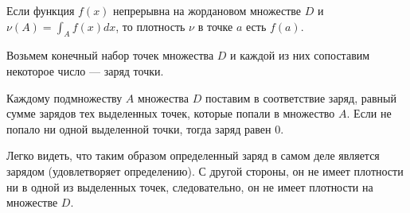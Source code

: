 \begin{theorem*}
    Если функция $f(x)$ непрерывна на жордановом множестве $D$ и $\nu(A) = \int_A f(x) dx$, то плотность $\nu$ в точке $a$ есть $f(a)$.
\end{theorem*}

\begin{example}
    Возьмем конечный набор точек множества $D$ и каждой из них сопоставим некоторое число --- заряд точки.

    Каждому подмножеству $A$ множества $D$ поставим в соответствие заряд, равный сумме зарядов тех выделенных точек, которые попали в множество $A$. Если не попало ни одной выделенной точки, тогда заряд равен $0$. 
    
    Легко видеть, что таким образом определенный заряд в самом деле является зарядом (удовлетворяет определению). С другой стороны, он не имеет плотности ни в одной из выделенных точек, следовательно, он не имеет плотности на множестве $D$.
\end{example}

